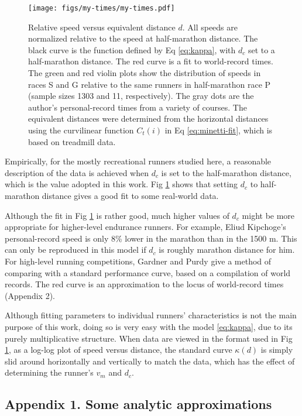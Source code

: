 \documentclass[10pt,letterpaper]{article}
\begin{document}
\begin{figure}[h]
\texttt{[image: figs/my-times/my-times.pdf]}
\centering
\caption{Relative speed versus equivalent distance $d$. All speeds are normalized relative to the speed at half-marathon distance.
The black curve is the function defined by Eq \ref{eq:kappa}, with $d_c$ set to a half-marathon distance.
The red curve is a 
fit to world-record times.\cite{cameron} 
The green and red violin plots show the distribution of speeds in races S and G relative to the same runners
in half-marathon race P (sample sizes 1303 and 11, respectively).
The gray dots are the author's personal-record times from a variety of courses.
The equivalent distances were determined from the horizontal distances using the curvilinear
function $C_t(i)$ in Eq \ref{eq:minetti-fit}, which is based on treadmill data. }
\label{fig:my-times}
\end{figure}

Empirically, for the mostly recreational runners studied here, a reasonable description of the data is achieved when
$d_c$ is set to the half-marathon distance, which is the value adopted in this work.
Fig \ref{fig:my-times} shows that
setting $d_c$ to half-marathon distance gives a good fit to some real-world data.

Although the fit in Fig \ref{fig:my-times} is rather good,
much higher values of $d_c$ might be more appropriate for higher-level endurance runners.
For example, Eliud Kipchoge's personal-record
speed is only 8\% lower in the marathon than in the 1500 m. This can only be reproduced in this model if $d_c$
is roughly marathon distance for him.
For high-level running competitions, Gardner and Purdy give a
method of comparing with a standard performance curve, based on a compilation of world
records.\cite{gardner} 
The red curve is an approximation to the locus of world-record times (Appendix 2).

Although fitting parameters to individual runners' characteristics is not the main purpose of this work, doing
so is very easy with the model \ref{eq:kappa}, due to its purely multiplicative structure.
When data are viewed in the format used in Fig \ref{fig:my-times}, as a log-log plot of speed versus distance,
the standard curve $\kappa(d)$ is simply slid around horizontally and vertically to match the data, which
has the effect of determining the runner's $v_m$ and $d_c$.

\subsection*{Appendix 1. Some analytic approximations}
\end{document}
